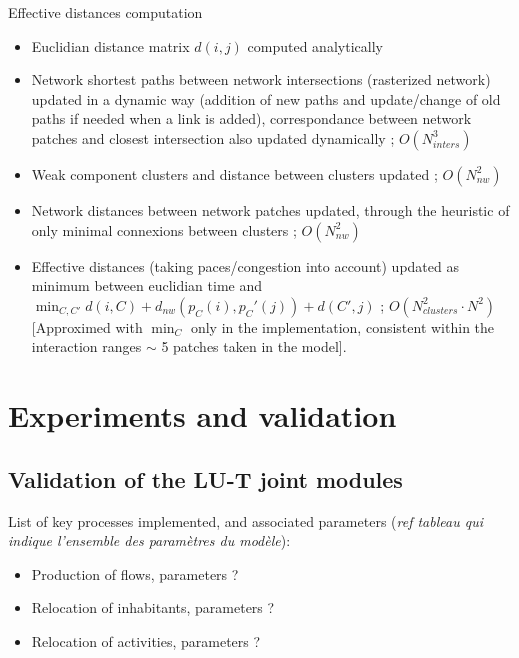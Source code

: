 Effective distances computation

\begin{itemize}
\item Euclidian distance matrix $d(i,j)$ computed analytically
\item Network shortest paths between network intersections (rasterized network) updated in a dynamic way (addition of new paths and update/change of old paths if needed when a link is added), correspondance between network patches and closest intersection also updated dynamically ; $O(N_{inters}^3)$
\item Weak component clusters and distance between clusters updated ; $O(N_{nw}^2)$
\item Network distances between network patches updated, through the heuristic of only minimal connexions between clusters ; $O(N_{nw}^2)$
\item Effective distances (taking paces/congestion into account) updated as minimum between euclidian time and $\min_{C,C'}{d(i,C)+d_{nw}(p_C(i),p_C'(j))+d(C',j)}$ ; $O(N_{clusters}^2\cdot N^2)$ [Approximed with $\min_C$ only in the implementation, consistent within the interaction ranges $\sim$ 5 patches taken in the model]. 
\end{itemize}











\section{Experiments and validation}




\subsection{Validation of the LU-T joint modules}

List of key processes implemented, and associated parameters (\textit{ref tableau qui indique l'ensemble des paramètres du modèle}):
\begin{itemize}
\item Production of flows, parameters ?
\item Relocation of inhabitants, parameters ?
\item Relocation of activities, parameters ?
\end{itemize}


